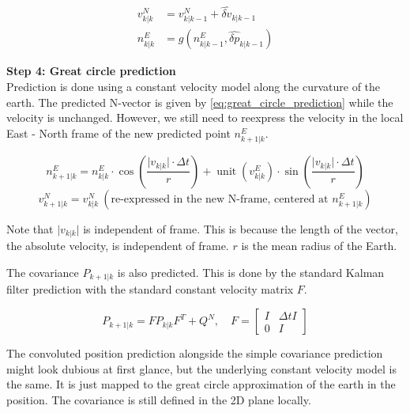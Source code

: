 \begin{align}
    v^N_{k \vert k} &= v^N_{k \vert k-1} + \widehat{\delta v}_{k \vert k-1} \\
    n^E_{k \vert k} &= g(n^E_{k \vert k-1}, \widehat{\delta p}_{k \vert k-1})
\end{align}

\textbf{Step 4: Great circle prediction} \\
Prediction is done using a constant velocity model along the curvature of the earth. The predicted N-vector is given by \autoref{eq:great_circle_prediction} while the velocity is unchanged. However, we still need to reexpress the velocity in the local East - North frame of the new predicted point $n^E_{k+1 \vert k}$.

\begin{equation}
    n^{E}_{k+1|k} = n^{E}_{k|k} \cdot \cos \left( \frac{\lvert v_{k|k}\rvert \cdot \Delta t}{r} \right)
 +
\operatorname{unit}\!\left(v^{E}_{k|k}\right) \cdot \sin\left( \frac{\lvert v_{k|k}\rvert \cdot \Delta t}{r} \right)
\label{eq:great_circle_prediction}
\end{equation}
\begin{equation*}
    v^N_{k+1 \vert k} = v^N_{k \vert k} \: (\text{re-expressed in the new N-frame, centered at } n^E_{k+1 \vert k})
\end{equation*}

Note that $\lvert v_{k|k}\rvert$ is independent of frame. This is because the length of the vector, the absolute velocity, is independent of frame. $r$ is the mean radius of the Earth.
\medskip

The covariance $P_{k+1 \vert k}$ is also predicted. This is done by the standard Kalman filter prediction with the standard constant velocity matrix $F$.

\begin{equation}
    P_{k+1 \vert k} = F P_{k \vert k} F^T + Q^N , \quad 
    F = \begin{bmatrix}
        I & \Delta t I \\
        0 & I 
    \end{bmatrix}
\end{equation}

The convoluted position prediction alongside the simple covariance prediction might look dubious at first glance, but the underlying constant velocity model is the same. It is just mapped to the great circle approximation of the earth in the position. The covariance is still defined in the 2D plane locally.

